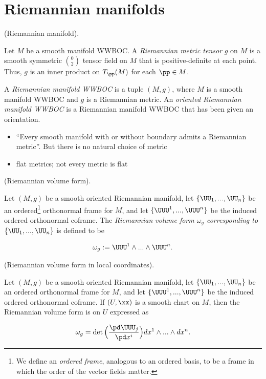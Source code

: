 \section{Riemannian manifolds}

\begin{defn}
     (Riemannian manifold).
    
    Let $M$ be a smooth manifold WWBOC. A \textit{Riemannian metric tensor} $g$ on $M$ is a smooth symmetric $\binom{0}{2}$ tensor field on $M$ that is positive-definite at each point. Thus, $g$ is an inner product on $T_\pp(M)$ for each $\pp \in M$.
    
    A \textit{Riemannian manifold WWBOC} is a tuple $(M, g)$, where $M$ is a smooth manifold WWBOC and $g$ is a Riemannian metric. An \textit{oriented Riemannian manifold WWBOC} is a Riemannian manifold WWBOC that has been given an orientation.
\end{defn}

\begin{theorem}
    \begin{itemize}
    \item {}``Every smooth manifold with or without boundary admits a Riemannian metric''. But there is no natural choice of metric
    \item {} flat metrics; not every metric is flat
\end{itemize}
\end{theorem}

\begin{defn}
     (Riemannian volume form).
    
    Let $(M, g)$ be a smooth oriented Riemannian manifold, let $\{\UU_1, ..., \UU_n\}$ be an ordered\footnote{We define an \textit{ordered frame}, analogous to an ordered basis, to be a frame in which the order of the vector fields matter.} orthonormal frame for $M$, and let $\{\UUU^1, ..., \UUU^n\}$ be the induced ordered orthonormal coframe. The \textit{Riemannian volume form $\omega_g$ corresponding to $\{\UU_1, ..., \UU_n\}$} is defined to be
    
    \begin{align*}
        \omega_g := \UUU^1 \wedge ... \wedge \UUU^n.
    \end{align*}
\end{defn}

\begin{theorem}
    (Riemannian volume form in local coordinates).
    
    Let $(M, g)$ be a smooth oriented Riemannian manifold, let $\{\UU_1, ..., \UU_n \}$ be an ordered orthonormal frame for $M$, and let $\{\UUU^1, ..., \UUU^n\}$ be the induced ordered orthonormal coframe. If $(U, \xx)$ is a smooth chart on $M$, then the Riemannian volume form is on $U$ expressed as
    
    \begin{align*}
        \omega_g = \det \Big( \frac{\pd \UUU_j}{\pd x^i} \Big) dx^1 \wedge ... \wedge dx^n.
    \end{align*}
\end{theorem}

